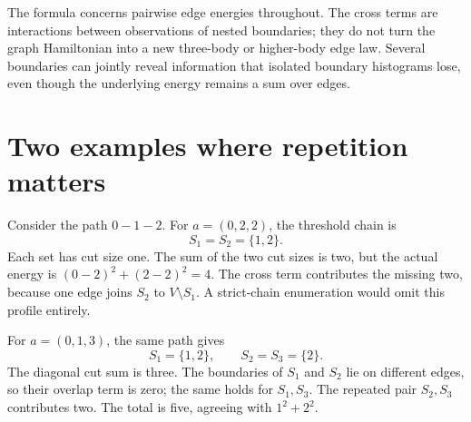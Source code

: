 \documentclass[
  11pt,
  a4paper,
]{report}
\begin{document}
The formula concerns pairwise edge energies throughout. The cross terms
are interactions between observations of nested boundaries; they do not
turn the graph Hamiltonian into a new three-body or higher-body edge
law. Several boundaries can jointly reveal information that isolated
boundary histograms lose, even though the underlying energy remains a
sum over edges.

\hypertarget{two-examples-where-repetition-matters}{%
\section{Two examples where repetition
matters}\label{two-examples-where-repetition-matters}}

Consider the path \(0-1-2\). For \(a=(0,2,2)\), the threshold chain is
\[
S_1=S_2=\{1,2\}.
\] Each set has cut size one. The sum of the two cut sizes is two, but
the actual energy is \((0-2)^2+(2-2)^2=4\). The cross term contributes
the missing two, because one edge joins \(S_2\) to \(V\setminus S_1\). A
strict-chain enumeration would omit this profile entirely.

For \(a=(0,1,3)\), the same path gives \[
S_1=\{1,2\},\qquad S_2=S_3=\{2\}.
\] The diagonal cut sum is three. The boundaries of \(S_1\) and \(S_2\)
lie on different edges, so their overlap term is zero; the same holds
for \(S_1,S_3\). The repeated pair \(S_2,S_3\) contributes two. The
total is five, agreeing with \(1^2+2^2\).
\end{document}
